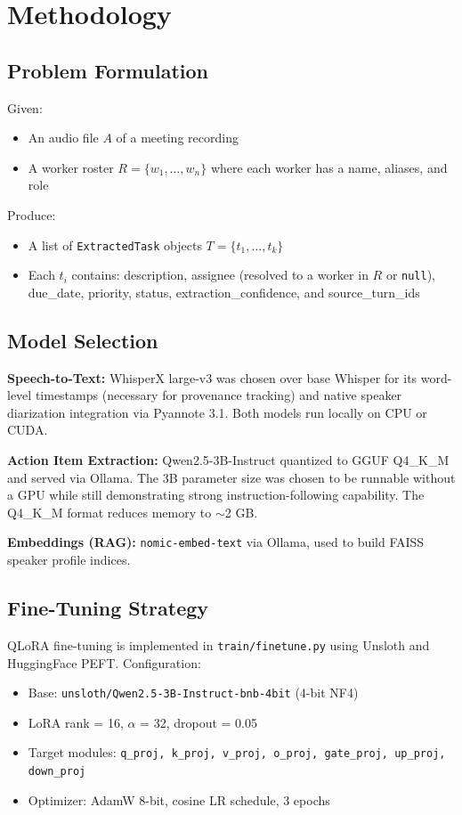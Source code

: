 \documentclass[12pt,a4paper]{article}
\begin{document}
\section{Methodology}

\subsection{Problem Formulation}
Given:
\begin{itemize}
    \item An audio file $A$ of a meeting recording
    \item A worker roster $R = \{w_1, \ldots, w_n\}$ where each worker has a name, aliases, and role
\end{itemize}
Produce:
\begin{itemize}
    \item A list of \texttt{ExtractedTask} objects $T = \{t_1, \ldots, t_k\}$
    \item Each $t_i$ contains: description, assignee (resolved to a worker in $R$ or \texttt{null}), due\_date, priority, status, extraction\_confidence, and source\_turn\_ids
\end{itemize}

\subsection{Model Selection}

\textbf{Speech-to-Text:} WhisperX large-v3 was chosen over base Whisper for its word-level timestamps (necessary for provenance tracking) and native speaker diarization integration via Pyannote 3.1. Both models run locally on CPU or CUDA.

\textbf{Action Item Extraction:} Qwen2.5-3B-Instruct \cite{qwen2024} quantized to GGUF Q4\_K\_M and served via Ollama. The 3B parameter size was chosen to be runnable without a GPU while still demonstrating strong instruction-following capability. The Q4\_K\_M format reduces memory to $\sim$2 GB.

\textbf{Embeddings (RAG):} \texttt{nomic-embed-text} via Ollama, used to build FAISS speaker profile indices.

\subsection{Fine-Tuning Strategy}

QLoRA fine-tuning is implemented in \texttt{train/finetune.py} using Unsloth and HuggingFace PEFT. Configuration:
\begin{itemize}
    \item Base: \texttt{unsloth/Qwen2.5-3B-Instruct-bnb-4bit} (4-bit NF4)
    \item LoRA rank = 16, $\alpha$ = 32, dropout = 0.05
    \item Target modules: \texttt{q\_proj, k\_proj, v\_proj, o\_proj, gate\_proj, up\_proj, down\_proj}
    \item Optimizer: AdamW 8-bit, cosine LR schedule, 3 epochs
\end{itemize}
\end{document}
